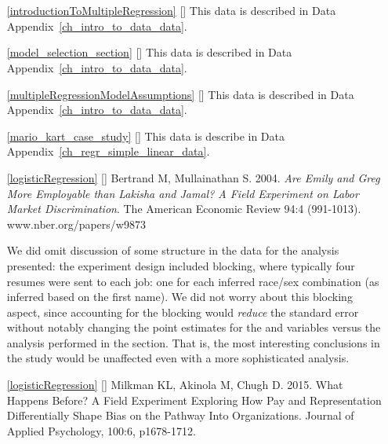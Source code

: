 \section{}
\label{ch_regr_mult_and_log_data}

\begin{itemize}
\item[\ref{introductionToMultipleRegression}]
    [\datalink{loans\_full\_schema}]
    This data is described in
    Data Appendix~\ref{ch_intro_to_data_data}.

\item[\ref{model_selection_section}]
    [\datalink{loans\_full\_schema}]
    This data is described in
    Data Appendix~\ref{ch_intro_to_data_data}.

\item[\ref{multipleRegressionModelAssumptions}]
    [\datalink{loans\_full\_schema}]
    This data is described in
    Data Appendix~\ref{ch_intro_to_data_data}.

\item[\ref{mario_kart_case_study}]
    [\datalink{mario\_kart}]
    This data is describe in
    Data Appendix~\ref{ch_regr_simple_linear_data}.

\item[\ref{logisticRegression}]
    [\datalink{resume}]
    Bertrand M, Mullainathan S. 2004.
    \emph{Are Emily and Greg More Employable than Lakisha and Jamal?
    A Field Experiment on Labor Market Discrimination}.
    The American Economic Review 94:4 (991-1013).
        {www.nber.org/papers/w9873}

    We did omit discussion of some structure in
    the data for the analysis presented:
    the experiment design included blocking,
    where typically four resumes were sent to each job:
    one for each inferred race/sex combination
    (as inferred based on the first name).
    We did not worry about this blocking aspect,
    since accounting for the blocking would
    \emph{reduce} the standard error without notably
    changing the point estimates for the
     and  variables
    versus the analysis performed in the section.
    That is, the most interesting conclusions in the
    study would be unaffected even with a more
    sophisticated analysis.

\item[\ref{logisticRegression}]
    [\datalink{research\_reply}]
    Milkman KL, Akinola M, Chugh D. 2015.
    What Happens Before?
    A Field Experiment Exploring How Pay and
    Representation Differentially Shape Bias
    on the Pathway Into Organizations.
    Journal of Applied Psychology, 100:6, p1678-1712.


\end{itemize}
